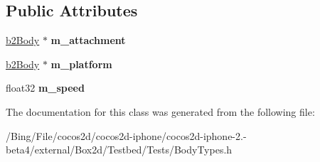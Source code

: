 \subsection*{Public Attributes}
\begin{DoxyCompactItemize}
\item 
\hypertarget{class_body_types_a3e887ce0bb653e396faef97378117364}{\hyperlink{classb2_body}{b2\-Body} $\ast$ {\bfseries m\-\_\-attachment}}\label{class_body_types_a3e887ce0bb653e396faef97378117364}

\item 
\hypertarget{class_body_types_ae2058a981affac2aa9d27dfdbb6e72da}{\hyperlink{classb2_body}{b2\-Body} $\ast$ {\bfseries m\-\_\-platform}}\label{class_body_types_ae2058a981affac2aa9d27dfdbb6e72da}

\item 
\hypertarget{class_body_types_a757736c322216e7d528664ee3669f716}{float32 {\bfseries m\-\_\-speed}}\label{class_body_types_a757736c322216e7d528664ee3669f716}

\end{DoxyCompactItemize}


The documentation for this class was generated from the following file\-:\begin{DoxyCompactItemize}
\item 
/\-Bing/\-File/cocos2d/cocos2d-\/iphone/cocos2d-\/iphone-\/2.-\/beta4/external/\-Box2d/\-Testbed/\-Tests/Body\-Types.\-h\end{DoxyCompactItemize}
